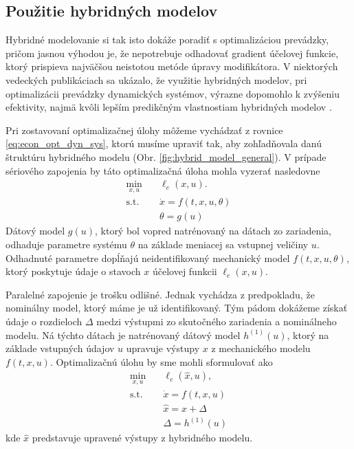 \subsection{Použitie hybridných modelov}
Hybridné modelovanie si tak isto dokáže poradiť s optimalizáciou prevádzky, pričom jasnou výhodou je, že nepotrebuje odhadovať gradient účelovej funkcie, ktorý prispieva najväčšou neistotou metóde úpravy modifikátora. V niektorých vedeckých publikáciach sa ukázalo, že využitie hybridných modelov, pri optimalizácii prevádzky dynamických systémov, výrazne dopomohlo k zvýšeniu efektivity, najmä kvôli lepším predikčným vlastnostiam hybridných modelov \cite{bhutani:hybrid_modelling_opt:2006}. 

Pri zostavovaní optimalizačnej úlohy môžeme vychádzať z rovnice \ref{eq:econ_opt_dyn_sys}, ktorú musíme upraviť tak, aby zohľadňovala danú štruktúru hybridného modelu (Obr. \ref{fig:hybrid_model_general}). V prípade sériového zapojenia by táto optimalizačná úloha mohla vyzerať nasledovne
\begin{equation}
	\begin{split}
		\min_{x,u} &\quad \ell_e\left(x,u\right).\\
		\text{s.t.} &\quad \dot{x} = f\left(t,x,u,\theta\right)\\
		&\quad \theta = g(u)
	\end{split}
\end{equation}
Dátový model $ g(u) $, ktorý bol vopred natrénovaný na dátach zo zariadenia, odhaduje parametre systému $ \theta $ na základe meniacej sa vstupnej veličiny $ u $. Odhadnuté parametre dopĺňajú neidentifikovaný mechanický model $ f(t,x,u,\theta) $, ktorý poskytuje údaje o stavoch $ x $ účelovej funkcii $ \ell_e\left(x,u\right) $. 

Paralelné zapojenie je trošku odlišné. Jednak vychádza z predpokladu, že nominálny model, ktorý máme je už identifikovaný. Tým pádom dokážeme získať údaje o rozdieloch $ \Delta $ medzi výstupmi zo skutočného zariadenia a nominálneho modelu. Ná týchto dátach je natrénovaný dátový model $ h^{(1)}(u) $, ktorý na základe vstupných údajov $ u $ upravuje výstupy $ x $ z mechanického modelu $ f(t,x,u) $. Optimalizačnú úlohu by sme mohli sformulovať ako
\begin{equation}
	\begin{split}
		\min_{x,u} &\quad \ell_e\left(\hat{x},u\right),\\
		\text{s.t.} &\quad \dot{x} = f\left(t,x,u\right)\\
		&\quad \hat{x} = x + \Delta\\
		&\quad \Delta = h^{(1)}(u)
	\end{split}
\end{equation}
kde $ \hat{x} $ predstavuje upravené výstupy z hybridného modelu.

